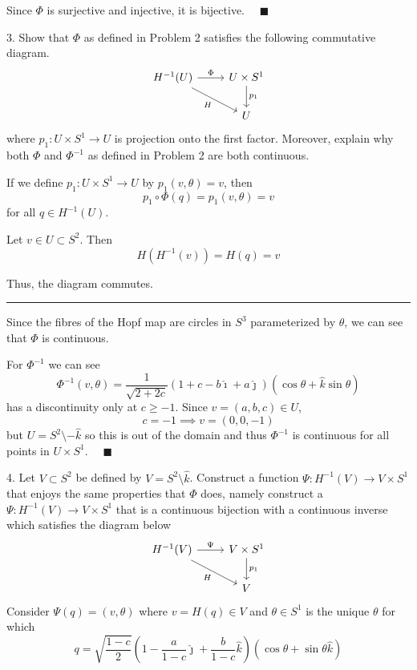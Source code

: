 \documentclass[12pt]{article}
\newcommand{\lra}{\longrightarrow}
\newcommand{\qed}{\quad \blacksquare}
\newcommand{\ihat}{\hat \imath}
\newcommand{\jhat}{\hat \jmath}
\newcommand{\khat}{\hat k}
\begin{document}
        Since $\Phi$ is surjective and injective, it is bijective. $\qed$           
    \color{black}

\pagebreak

3.  Show that $\Phi$ as defined in Problem 2 satisfies the following commutative diagram.
\[\begin{tikzcd}
H^{-1}(U) \arrow{r}{\Phi} \arrow{dr}[swap]{H} & U\times S^{1} \arrow{d}{p_{1}} \\
& U
\end{tikzcd}\]
where $p_{1}: U \times S^{1} \lra U$ is projection onto the first factor.  Moreover, explain why both $\Phi$ and $\Phi^{-1}$ as defined in Problem 2 are both continuous. 

    \color{blue}
        If we define $p_1: U \times S^1 \to U$ by $p_1(v, \theta) = v$, then 
        \[p_1 \circ \Phi(q) = p_1(v, \theta) = v\]
        for all $q \in H^{-1}(U)$. 

        Let $v \in U \subset S^2$. Then 
        \[H(H^{-1}(v)) = H(q) = v\]

        Thus, the diagram commutes.

        \vspace*{10pt}
        \hrule 
        \vspace*{10pt}

        Since the fibres of the Hopf map are circles in $S^3$ parameterized by $\theta$, we can see that $\Phi$ is continuous.

        For $\Phi^{-1}$ we can see 
        \[\Phi^{-1}(v, \theta) = \frac{1}{\sqrt{2 + 2c}}(1 + c - b\ihat + a\jhat)(\cos \theta + \khat \sin \theta)\]
        has a discontinuity only at $c \geq -1$. Since $v = (a, b, c) \in U$, 
        \[c = -1 \implies v = (0, 0, -1)\]
        but $U = S^2\setminus -\khat$ so this is out of the domain and thus $\Phi^{-1}$ is continuous for all points in $U \times S^1$. $\qed$

    \color{black}


\pagebreak 

4.  Let $V \subset S^{2}$ be defined by $V= S^{2}\setminus \hat{k}$.  Construct a function $\Psi: H^{-1}(V) \lra V\times S^{1} $ that enjoys the same properties that $\Phi$ does, namely construct a $\Psi :  H^{-1}(V) \lra V\times S^{1}$ that is a continuous bijection with a continuous inverse which satisfies the diagram below
\[\begin{tikzcd}
H^{-1}(V) \arrow{r}{\Psi} \arrow{dr}[swap]{H} & V\times S^{1} \arrow{d}{p_{1}} \\
& V
\end{tikzcd}\]
    \color{blue}
        Consider $\Psi(q) = (v, \theta)$ where $v = H(q) \in V$ and $\theta \in S^1$ is the unique $\theta$ for which
        \[q = \sqrt{\frac{1 - c}{2}}\left(1 - \frac{a}{1 - c}\jhat + \frac{b}{1 - c}\khat\right)(\cos \theta + \sin \theta \khat)\]
\end{document}
